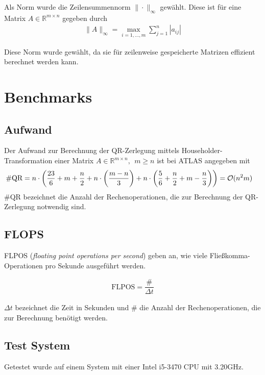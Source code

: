 Als Norm wurde die Zeilensummennorm $\|\cdot\|_\infty$ gewählt.
Diese ist für eine Matrix $A \in \mathbb{R}^{m\times n}$ gegeben durch
\begin{align*}
\|A\|_\infty = \max_{i=1,...,m} \sum_{j=1}^{n} |a_{ij}|
\end{align*}

Diese Norm wurde gewählt, da sie für zeilenweise gespeicherte Matrizen effizient berechnet werden kann.

\section{Benchmarks}

\subsection{Aufwand}

Der Aufwand zur Berechnung der QR-Zerlegung mittels Householder-Transformation einer Matrix $A \in \mathbb{R}^{m \times n},~~ m \ge n$ ist bei ATLAS \cite{atlas} angegeben mit
\begin{align*}
\#\text{QR} &= n \cdot \left(\frac{23}{6} + m + \dfrac{n}{2} + n\cdot \left(\frac{m-n}{3} \right) + n\cdot \left(\dfrac{5}{6} + \dfrac{n}{2} + m - \dfrac{n}{3}\right)\right) = {\cal O}(n^2m)
\end{align*}
$\#\text{QR}$ bezeichnet die Anzahl der Rechenoperationen, die zur Berechnung der QR-Zerlegung notwendig sind. 

\subsection{FLOPS}
FLPOS (\textit{floating point operations per second}) geben an, wie viele Fließkomma-Operationen pro Sekunde ausgeführt werden.

\begin{align*}
  \text{FLPOS} = \dfrac{\#}{\Delta t}
\end{align*}

$\Delta t$ bezeichnet die Zeit in Sekunden und $\#$ die Anzahl der Rechenoperationen, die zur Berechnung benötigt werden.

\subsection{Test System}

Getestet wurde auf einem System mit einer Intel i5-3470 CPU mit 3.20GHz. 

